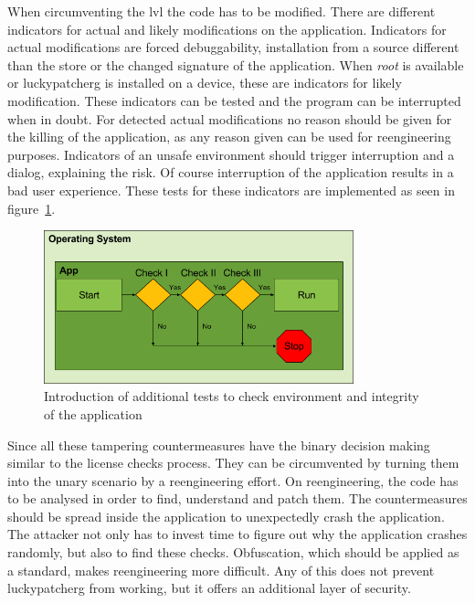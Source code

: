When circumventing the \gls{lvl} the code has to be modified.
There are different indicators for actual and likely modifications on the application.
Indicators for actual modifications are forced debuggability, installation from a source different than the store or the changed signature of the application.
When \textit{root} is available or \gls{luckypatcherg} is installed on a device, these are indicators for likely modification.
\newline
These indicators can be tested and the program can be interrupted when in doubt.
For detected actual modifications no reason should be given for the killing of the application, as any reason given can be used for reengineering purposes.
Indicators of an unsafe environment should trigger interruption and a dialog, explaining the risk.
Of course interruption of the application results in a bad user experience.
\newline
These tests for these indicators are implemented as seen in figure~\ref{fig:verificationNowAdditional}.
\begin{figure}[h]
    \centering
    \includegraphics[width=0.8\textwidth]{data/verificationNowAdditional.png}
    \caption{Introduction of additional tests to check environment and integrity of the application}
    \label{fig:verificationNowAdditional}
\end{figure}
Since all these tampering countermeasures have the binary decision making similar to the license checks process.
They can be circumvented by turning them into the unary scenario by a reengineering effort.
\newline
On reengineering, the code has to be analysed in order to find, understand and patch them.
The countermeasures should be spread inside the application to unexpectedly crash the application.
The attacker not only has to invest time to figure out why the application crashes randomly, but also to find these checks.
Obfuscation, which should be applied as a standard, makes reengineering more difficult.
\newline
Any of this does not prevent \gls{luckypatcherg} from working, but it offers an additional layer of security.
